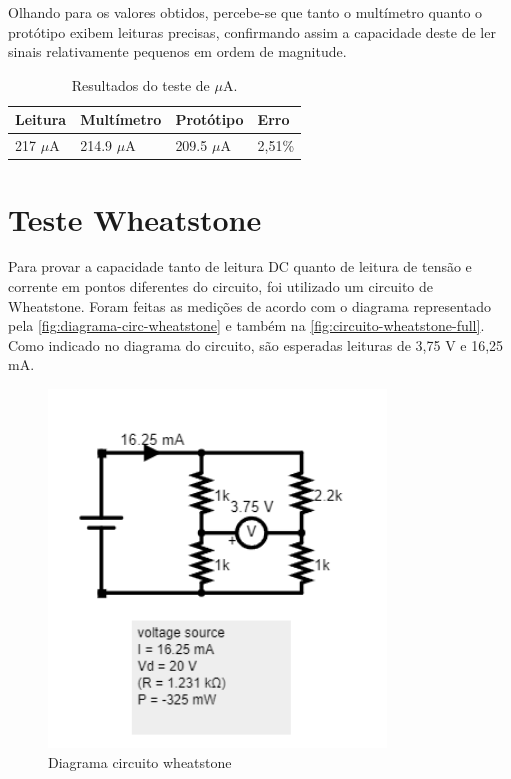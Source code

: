Olhando para os valores obtidos, percebe-se que tanto o multímetro quanto o protótipo exibem leituras precisas, confirmando assim a capacidade deste de ler sinais relativamente pequenos em ordem de magnitude.

\begin{table}[!ht]
    \centering
    \caption{Resultados do teste de $\mu$A.}
    \label{tab:resultados-ua}
    \begin{tabular}{|l|l|l|l|}
        \hline
        \textbf{Leitura}  & \textbf{Multímetro}  & \textbf{Protótipo}  & \textbf{Erro}   \\ \hline
        217 $\mu$A        & 214.9 $\mu$A         & 209.5 $\mu$A        & 2,51\%             \\ \hline
    \end{tabular}
\end{table}

\section{Teste Wheatstone}\label{teste-Wheatstone}

Para provar a capacidade tanto de leitura DC quanto de leitura de tensão e corrente em pontos diferentes do circuito, foi utilizado um circuito de Wheatstone. Foram feitas as medições de acordo com o diagrama representado pela \autoref{fig:diagrama-circ-wheatstone} e também na \autoref{fig:circuito-wheatstone-full}. Como indicado no diagrama do circuito, são esperadas leituras de 3,75 V e 16,25 mA.

\begin{figure}[htb!]
    \caption{Diagrama circuito wheatstone}
    \label{fig:diagrama-circ-wheatstone}
    \includegraphics[width=0.8\textwidth]{figuras/diagrama-circ-wheatstone.png}
    \fonte{}
\end{figure}

